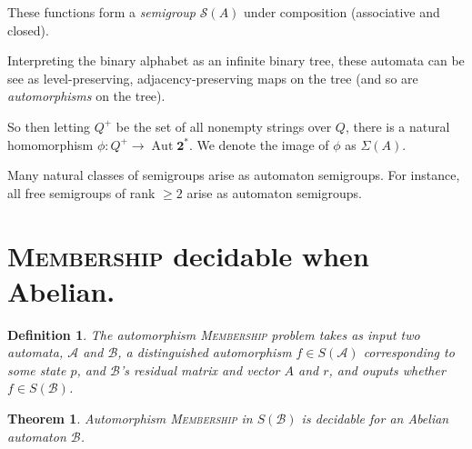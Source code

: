 \documentclass[a0]{a0poster}
\newcommand{\decprob}[1]{\textsc{#1}}
\newcommand{\Z}{\mathbb{Z}}
\newcommand{\A}{\mathcal{A}}
\newcommand{\B}{\mathcal{B}}
\newcommand{\defn}[1]{{\color{NavyBlue}\emph{#1}}}
\newcommand{\defndecprob}[1]{{\color{NavyBlue}\textsc{#1}}}
\theoremstyle{pleasant}
\newtheorem{theorem}{Theorem}
\newtheorem{definition}{Definition}
\newenvironment{proofsketch}{\paragraph{\large \normalfont \textit{Proof Sketch:}}}{\hfill$\square$}
\newcommand{\0}{\underline{0}}
\newcommand{\1}{\underline{1}}
\newcommand{\2}{\underline{2}}
\renewcommand{\S}{\mathcal{S}}
\begin{document}
\begin{multicols}{3}
These functions form a \defn{semigroup} $\S(A)$ under composition
(associative and closed).

Interpreting the binary alphabet as an infinite binary tree, these
automata can be see as level-preserving, adjacency-preserving maps on
the tree (and so are \defn{automorphisms} on the tree).


So then letting $Q^+$ be the set of all nonempty strings over $Q$,
there is a natural homomorphism
$\phi : Q^+ \rightarrow \operatorname{Aut}\textbf{2}^*$. We denote the
image of $\phi$ as $\Sigma(A)$.


Many natural classes of semigroups arise as automaton semigroups. For
instance, all free semigroups of rank $\geq 2$ arise as automaton
semigroups.

\section*{\decprob{Membership} decidable when Abelian.}

\begin{definition}
  The automorphism \defndecprob{Membership} problem takes as input two
  automata, $\A$ and $\B$, a distinguished automorphism $f \in S(\A)$
  corresponding to some state $p$, and $\B$'s residual matrix and
  vector $A$ and $r$, and ouputs whether $f \in S(\B)$.
\end{definition}

\begin{theorem}
  Automorphism \decprob{Membership} in $S(\B)$ is decidable for an Abelian
  automaton $\B$.
\end{theorem}



\end{multicols}
\end{document}
